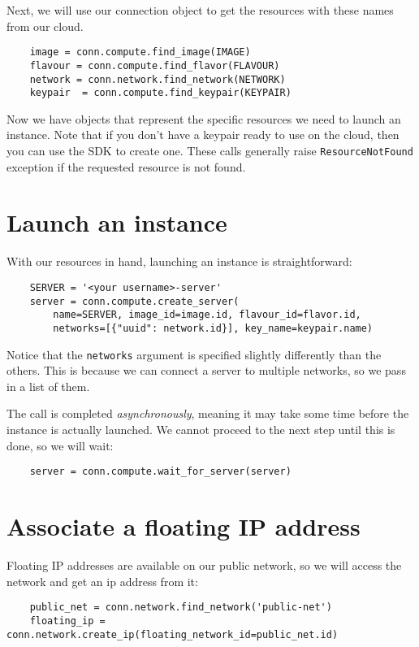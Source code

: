 \documentclass{article}
\begin{document}
\newpage

Next, we will use our connection object to get the resources with these names from our cloud.

\begin{verbatim}
    image = conn.compute.find_image(IMAGE)
    flavour = conn.compute.find_flavor(FLAVOUR)
    network = conn.network.find_network(NETWORK)
    keypair  = conn.compute.find_keypair(KEYPAIR)
\end{verbatim}

Now we have objects that represent the specific resources we need to launch an instance. Note that if you don't have a keypair ready to use on the cloud, then you can use the SDK to create one. These calls generally raise \texttt{ResourceNotFound} exception if the requested resource is not found.

\section{Launch an instance}
With our resources in hand, launching an instance is straightforward:

\begin{verbatim}
    SERVER = '<your username>-server'
    server = conn.compute.create_server(
        name=SERVER, image_id=image.id, flavour_id=flavor.id,
        networks=[{"uuid": network.id}], key_name=keypair.name) 
\end{verbatim}

Notice that the \texttt{networks} argument is specified slightly differently than the others. This is because we can connect a server to multiple networks, so we pass in a list of them.

The call is completed \emph{asynchronously}, meaning it may take some time before the instance is actually launched. We cannot proceed to the next step until this is done, so we will wait:

\begin{verbatim}
    server = conn.compute.wait_for_server(server)
\end{verbatim}


\section{Associate a floating IP address}
Floating IP addresses are available on our public network, so we will access the network and get an ip address from it:

\begin{verbatim}
    public_net = conn.network.find_network('public-net')
    floating_ip = conn.network.create_ip(floating_network_id=public_net.id) 
\end{verbatim}
\end{document}

